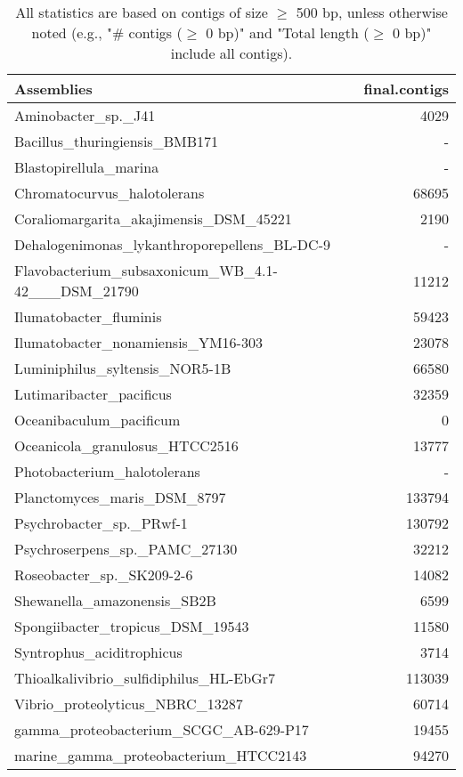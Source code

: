 \documentclass[12pt,a4paper]{article}
\begin{document}
\begin{table}[ht]
\begin{center}
\caption{All statistics are based on contigs of size $\geq$ 500 bp, unless otherwise noted (e.g., "\# contigs ($\geq$ 0 bp)" and "Total length ($\geq$ 0 bp)" include all contigs).}
\begin{tabular}{|l*{1}{|r}|}
\hline
Assemblies & final.contigs \\ \hline
Aminobacter\_sp.\_J41 & 4029 \\ \hline
Bacillus\_thuringiensis\_BMB171 & - \\ \hline
Blastopirellula\_marina & - \\ \hline
Chromatocurvus\_halotolerans & 68695 \\ \hline
Coraliomargarita\_akajimensis\_DSM\_45221 & 2190 \\ \hline
Dehalogenimonas\_lykanthroporepellens\_BL-DC-9 & - \\ \hline
Flavobacterium\_subsaxonicum\_WB\_4.1-42\_\_\_DSM\_21790 & 11212 \\ \hline
Ilumatobacter\_fluminis & 59423 \\ \hline
Ilumatobacter\_nonamiensis\_YM16-303 & 23078 \\ \hline
Luminiphilus\_syltensis\_NOR5-1B & 66580 \\ \hline
Lutimaribacter\_pacificus & 32359 \\ \hline
Oceanibaculum\_pacificum & 0 \\ \hline
Oceanicola\_granulosus\_HTCC2516 & 13777 \\ \hline
Photobacterium\_halotolerans & - \\ \hline
Planctomyces\_maris\_DSM\_8797 & 133794 \\ \hline
Psychrobacter\_sp.\_PRwf-1 & 130792 \\ \hline
Psychroserpens\_sp.\_PAMC\_27130 & 32212 \\ \hline
Roseobacter\_sp.\_SK209-2-6 & 14082 \\ \hline
Shewanella\_amazonensis\_SB2B & 6599 \\ \hline
Spongiibacter\_tropicus\_DSM\_19543 & 11580 \\ \hline
Syntrophus\_aciditrophicus & 3714 \\ \hline
Thioalkalivibrio\_sulfidiphilus\_HL-EbGr7 & 113039 \\ \hline
Vibrio\_proteolyticus\_NBRC\_13287 & 60714 \\ \hline
gamma\_proteobacterium\_SCGC\_AB-629-P17 & 19455 \\ \hline
marine\_gamma\_proteobacterium\_HTCC2143 & 94270 \\ \hline
\end{tabular}
\end{center}
\end{table}
\end{document}

